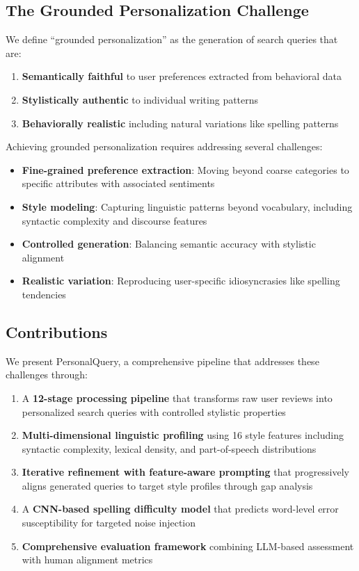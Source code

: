 \documentclass[11pt]{article}
\newcommand{\method}{PersonalQuery}
\begin{document}
\subsection{The Grounded Personalization Challenge}

We define ``grounded personalization'' as the generation of search queries that are:
\begin{enumerate}
    \item \textbf{Semantically faithful} to user preferences extracted from behavioral data
    \item \textbf{Stylistically authentic} to individual writing patterns
    \item \textbf{Behaviorally realistic} including natural variations like spelling patterns
\end{enumerate}

Achieving grounded personalization requires addressing several challenges:
\begin{itemize}
    \item \textbf{Fine-grained preference extraction}: Moving beyond coarse categories to specific attributes with associated sentiments
    \item \textbf{Style modeling}: Capturing linguistic patterns beyond vocabulary, including syntactic complexity and discourse features
    \item \textbf{Controlled generation}: Balancing semantic accuracy with stylistic alignment
    \item \textbf{Realistic variation}: Reproducing user-specific idiosyncrasies like spelling tendencies
\end{itemize}

\subsection{Contributions}

We present \method{}, a comprehensive pipeline that addresses these challenges through:

\begin{enumerate}
    \item A \textbf{12-stage processing pipeline} that transforms raw user reviews into personalized search queries with controlled stylistic properties

    \item \textbf{Multi-dimensional linguistic profiling} using 16 style features including syntactic complexity, lexical density, and part-of-speech distributions

    \item \textbf{Iterative refinement with feature-aware prompting} that progressively aligns generated queries to target style profiles through gap analysis

    \item A \textbf{CNN-based spelling difficulty model} that predicts word-level error susceptibility for targeted noise injection

    \item \textbf{Comprehensive evaluation framework} combining LLM-based assessment with human alignment metrics
\end{enumerate}
\end{document}
